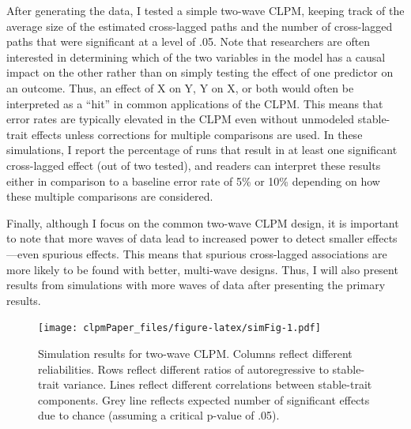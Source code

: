 \documentclass[
  english,
  man,floatsintext]{apa6}
\begin{document}
After generating the data, I tested a simple two-wave CLPM, keeping track of the average size of the estimated cross-lagged paths and the number of cross-lagged paths that were significant at a level of .05. Note that researchers are often interested in determining which of the two variables in the model has a causal impact on the other rather than on simply testing the effect of one predictor on an outcome. Thus, an effect of X on Y, Y on X, or both would often be interpreted as a ``hit'' in common applications of the CLPM. This means that error rates are typically elevated in the CLPM even without unmodeled stable-trait effects unless corrections for multiple comparisons are used. In these simulations, I report the percentage of runs that result in at least one significant cross-lagged effect (out of two tested), and readers can interpret these results either in comparison to a baseline error rate of 5\% or 10\% depending on how these multiple comparisons are considered.

Finally, although I focus on the common two-wave CLPM design, it is important to note that more waves of data lead to increased power to detect smaller effects---even spurious effects. This means that spurious cross-lagged associations are more likely to be found with better, multi-wave designs. Thus, I will also present results from simulations with more waves of data after presenting the primary results.

\begin{figure}
\centering
\texttt{[image: clpmPaper\_files/figure-latex/simFig-1.pdf]}
\caption{\label{fig:simFig}Simulation results for two-wave CLPM. Columns reflect different reliabilities. Rows reflect different ratios of autoregressive to stable-trait variance. Lines reflect different correlations between stable-trait components. Grey line reflects expected number of significant effects due to chance (assuming a critical p-value of .05).}
\end{figure}
\end{document}
